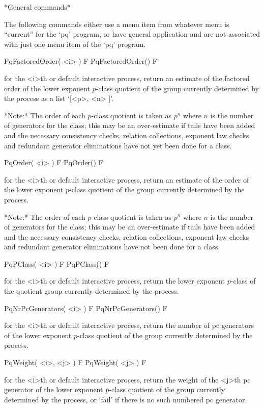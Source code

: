 *General commands*

The following commands either use a  menu  item  from  whatever  menu  is
``current'' for the `pq' program, or have general application and are  not
associated with just one menu item of the `pq' program.

\>PqFactoredOrder( <i> ) F
\>PqFactoredOrder() F

for the <i>th or default interactive {\ANUPQ} process, return an estimate
of the factored order of the lower exponent  $p$-class  quotient  of  the
group currently determined by the process as a list `[<p>, <n> ]'.

*Note:* The order of each $p$-class quotient is taken as $p^n$ where  $n$
is the number of generators for the class; this may be  an  over-estimate
if tails have been added and the necessary consistency  checks,  relation
collections, exponent law checks  and  redundant  generator  eliminations
have not yet been done for a class.

\>PqOrder( <i> ) F
\>PqOrder() F

for the <i>th or default interactive {\ANUPQ} process, return an estimate
of the order of the  lower  exponent  $p$-class  quotient  of  the  group
currently determined by the process.

*Note:* The order of each $p$-class quotient is taken as $p^n$ where  $n$
is the number of generators for the class; this may be  an  over-estimate
if tails have been added and the necessary consistency  checks,  relation
collections, exponent law checks  and  redundant  generator  eliminations
have not been done for a class.

\>PqPClass( <i> ) F
\>PqPClass() F

for the <i>th or default interactive {\ANUPQ} process, return  the  lower
exponent $p$-class of the quotient  group  currently  determined  by  the
process.

\>PqNrPcGenerators( <i> ) F
\>PqNrPcGenerators() F

for the <i>th or default interactive {\ANUPQ} process, return the  number
of pc generators of the lower exponent $p$-class quotient  of  the  group
currently determined by the process.

\>PqWeight( <i>, <j> ) F
\>PqWeight( <j> ) F

for the <i>th or default interactive {\ANUPQ} process, return the  weight
of the <j>th pc generator of the lower exponent $p$-class quotient of the
group currently determined by the process, or `fail' if there is no  such
numbered pc generator.


